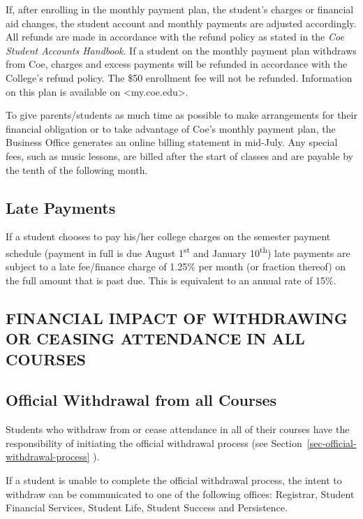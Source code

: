 \documentclass[
  letterpaper,
]{scrbook}
\begin{document}
If, after enrolling in the monthly payment plan, the student's charges
or financial aid changes, the student account and monthly payments are
adjusted accordingly. All refunds are made in accordance with the refund
policy as stated in the \emph{Coe Student Accounts Handbook}. If a
student on the monthly payment plan withdraws from Coe, charges and
excess payments will be refunded in accordance with the College's refund
policy. The \$50 enrollment fee will not be refunded. Information on
this plan is available on \textless my.coe.edu\textgreater.

To give parents/students as much time as possible to make arrangements
for their financial obligation or to take advantage of Coe's monthly
payment plan, the Business Office generates an online billing statement
in mid-July. Any special fees, such as music lessons, are billed after
the start of classes and are payable by the tenth of the following
month.

\subsection{Late Payments}\label{late-payments}

If a student chooses to pay his/her college charges on the semester
payment schedule (payment in full is due August 1\textsuperscript{st}
and January 10\textsuperscript{th}) late payments are subject to a late
fee/finance charge of 1.25\% per month (or fraction thereof) on the full
amount that is past due. This is equivalent to an annual rate of 15\%.

\subsection{FINANCIAL IMPACT OF WITHDRAWING OR CEASING ATTENDANCE IN ALL
COURSES}\label{financial-impact-of-withdrawing-or-ceasing-attendance-in-all-courses}

\subsection{Official Withdrawal from all
Courses}\label{official-withdrawal-from-all-courses}

Students who withdraw from or cease attendance in all of their courses
have the responsibility of initiating the official withdrawal process
(see Section~\ref{sec-official-withdrawal-process} ).

If a student is unable to complete the official withdrawal process, the
intent to withdraw can be communicated to one of the following offices:
Registrar, Student Financial Services, Student Life, Student Success and
Persistence.
\end{document}
